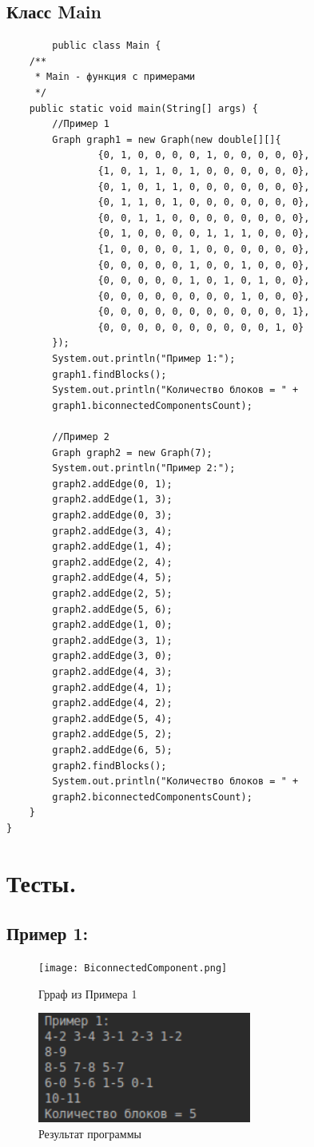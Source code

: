\documentclass[12pt,a4paper]{scrartcl}
\begin{document}
	\subsection{Класс Main}
	\begin{verbatim}
	    public class Main {
    /**
     * Main - функция с примерами
     */
    public static void main(String[] args) {
        //Пример 1
        Graph graph1 = new Graph(new double[][]{
                {0, 1, 0, 0, 0, 0, 1, 0, 0, 0, 0, 0},
                {1, 0, 1, 1, 0, 1, 0, 0, 0, 0, 0, 0},
                {0, 1, 0, 1, 1, 0, 0, 0, 0, 0, 0, 0},
                {0, 1, 1, 0, 1, 0, 0, 0, 0, 0, 0, 0},
                {0, 0, 1, 1, 0, 0, 0, 0, 0, 0, 0, 0},
                {0, 1, 0, 0, 0, 0, 1, 1, 1, 0, 0, 0},
                {1, 0, 0, 0, 0, 1, 0, 0, 0, 0, 0, 0},
                {0, 0, 0, 0, 0, 1, 0, 0, 1, 0, 0, 0},
                {0, 0, 0, 0, 0, 1, 0, 1, 0, 1, 0, 0},
                {0, 0, 0, 0, 0, 0, 0, 0, 1, 0, 0, 0},
                {0, 0, 0, 0, 0, 0, 0, 0, 0, 0, 0, 1},
                {0, 0, 0, 0, 0, 0, 0, 0, 0, 0, 1, 0}
        });
        System.out.println("Пример 1:");
        graph1.findBlocks();
        System.out.println("Количество блоков = " +
        graph1.biconnectedComponentsCount);

        //Пример 2
        Graph graph2 = new Graph(7);
        System.out.println("Пример 2:");
        graph2.addEdge(0, 1);
        graph2.addEdge(1, 3);
        graph2.addEdge(0, 3);
        graph2.addEdge(3, 4);
        graph2.addEdge(1, 4);
        graph2.addEdge(2, 4);
        graph2.addEdge(4, 5);
        graph2.addEdge(2, 5);
        graph2.addEdge(5, 6);
        graph2.addEdge(1, 0);
        graph2.addEdge(3, 1);
        graph2.addEdge(3, 0);
        graph2.addEdge(4, 3);
        graph2.addEdge(4, 1);
        graph2.addEdge(4, 2);
        graph2.addEdge(5, 4);
        graph2.addEdge(5, 2);
        graph2.addEdge(6, 5);
        graph2.findBlocks();
        System.out.println("Количество блоков = " +
        graph2.biconnectedComponentsCount);
    }
}
	\end{verbatim}
	\newpage
\section{Тесты.}
\subsection{Пример 1:}
	\begin{figure}[h]
	\begin{multicols}{2}
		\hfill
		\texttt{[image: BiconnectedComponent.png]}
		\hfill
		\caption{Грраф из Примера 1}
		\hfill
		\includegraphics[width=70mm]{ex1.png}
		\hfill
		\caption{Результат программы}
	\end{multicols}
\end{figure}
\end{document}
